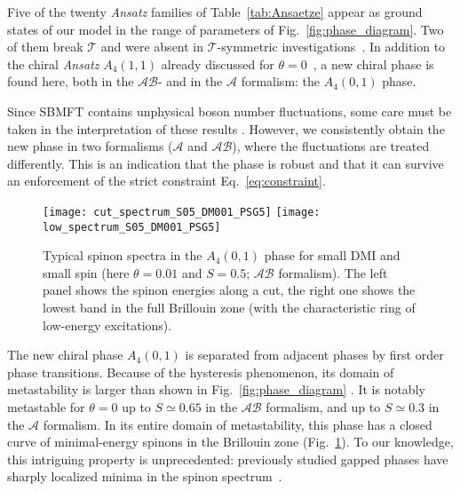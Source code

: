 \documentclass[aps,prl,twocolumn,superscriptaddress,showpacs,a4paper, longbibliography]{revtex4-1}
\begin{document}
Five of the twenty \textit{Ansatz} families of Table~\ref{tab:Ansaetze} appear as ground states of our model in the range of parameters of Fig.~\ref{fig:phase_diagram}.
Two of them break $\mathcal T$ and were absent in $\mathcal T$-symmetric investigations~\cite{Moi_DM}.
In addition to the chiral \textit{Ansatz} $A_4(1,1)$ already discussed for $\theta=0$~\cite{cuboc1}, a new chiral phase is found here, both in the $\mathcal A\mathcal B$- and in the $\mathcal A$ formalism: the $A_4(0, 1)$ phase.

Since SBMFT contains unphysical boson number fluctuations, some care must be taken in the interpretation of these results \cite{Trumper_AB_SBMFT}.
However, we consistently obtain the new phase in two formalisms ($\mathcal A$ and $\mathcal A\mathcal B$), where the fluctuations are treated differently.
This is an indication that the phase is robust and that it can survive an enforcement of the strict constraint Eq.~\eqref{eq:constraint}.

\begin{figure}
 \texttt{[image: cut\_spectrum\_S05\_DM001\_PSG5]}
 \texttt{[image: low\_spectrum\_S05\_DM001\_PSG5]}
 \caption{Typical spinon spectra in the $A_4(0,1)$ phase for small DMI and small spin (here $\theta=0.01$ and $S=0.5$; $\mathcal A\mathcal B$ formalism).
 The left panel shows the spinon energies along a cut, the right one shows the lowest band in the full Brillouin zone 
 (with the characteristic ring of low-energy excitations).
 \label{fig:spinons}
 }
\end{figure}

The new chiral phase $A_4(0,1)$ is separated from adjacent phases by first order phase transitions.
Because of the hysteresis phenomenon, its domain of metastability is larger than shown in Fig.~\ref{fig:phase_diagram} \cite{suppMat}.
It is notably metastable for $\theta=0$ up to $S\simeq0.65$ in the $\mathcal A\mathcal B$ formalism, and up to $S\simeq0.3$ in the $\mathcal A$ formalism.
In its entire domain of metastability, this phase has a closed curve of minimal-energy spinons in the Brillouin zone (Fig.~\ref{fig:spinons}).
To our knowledge, this intriguing property is unprecedented: previously studied gapped phases have sharply localized minima in the spinon spectrum~\cite{suppMat}.
\end{document}
